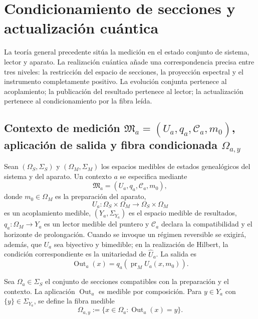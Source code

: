 
\section{Condicionamiento de secciones y actualización cuántica}
\label{sec:medicion-cuantica-genealogica-rev2}

La teoría general precedente sitúa la medición en el estado conjunto de
sistema, lector y aparato. La realización cuántica añade una correspondencia
precisa entre tres niveles: la restricción del espacio de secciones, la
proyección espectral y el instrumento completamente positivo. La evolución
conjunta pertenece al acoplamiento; la publicación del resultado pertenece al
lector; la actualización pertenece al condicionamiento por la fibra leída.

\subsection{Contexto de medición \(\mathfrak M_a=(U_a,q_a,\mathcal C_a,m_0)\), aplicación de salida y fibra condicionada \(\Omega_{a,y}\)}

Sean \((\Omega_S,\Sigma_S)\) y \((\Omega_M,\Sigma_M)\) los espacios
medibles de estados genealógicos del sistema y del aparato. Un contexto
\(a\) se especifica mediante
\begin{equation}
 \mathfrak M_a=(U_a,q_a,\mathcal C_a,m_0),
 \label{eq:contexto-medida-rev2}
\end{equation}
donde \(m_0\in\Omega_M\) es la preparación del aparato,
\[
 U_a:\Omega_S\times\Omega_M
 \longrightarrow\Omega_S\times\Omega_M
\]
es un acoplamiento medible, \((Y_a,\Sigma_{Y_a})\) es el espacio medible de
resultados, \(q_a:\Omega_M\to Y_a\) es un lector medible del puntero y
\(\mathcal C_a\) declara la compatibilidad y el horizonte de prolongación.
Cuando se invoque un régimen reversible se exigirá, además, que \(U_a\) sea
biyectivo y bimedible; en la realización de Hilbert, la condición
correspondiente es la unitariedad de \(\widehat U_a\).
La salida es
\begin{equation}
 \operatorname{Out}_a(x)
 =q_a\!\left(\operatorname{pr}_M U_a(x,m_0)\right).
 \label{eq:salida-contexto-medida-rev2}
\end{equation}

Sea \(\Omega_a\in\Sigma_S\) el conjunto de secciones compatibles con
la preparación y el contexto. La aplicación \(\operatorname{Out}_a\) es
medible por composición. Para \(y\in Y_a\) con
\(\{y\}\in\Sigma_{Y_a}\), se define la fibra medible
\begin{equation}
 \Omega_{a,y}
 :=\{x\in\Omega_a:\operatorname{Out}_a(x)=y\}.
 \label{eq:fibra-resultado-medida-rev2}
\end{equation}

